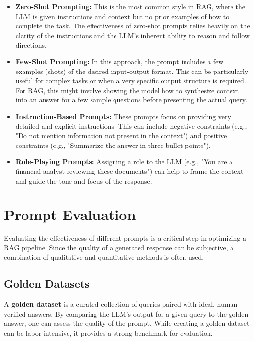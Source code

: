 \begin{itemize}
    \item \textbf{Zero-Shot Prompting:} This is the most common style in RAG, where the LLM is given instructions and context but no prior examples of how to complete the task. The effectiveness of zero-shot prompts relies heavily on the clarity of the instructions and the LLM's inherent ability to reason and follow directions.
    
    \item \textbf{Few-Shot Prompting:} In this approach, the prompt includes a few examples (shots) of the desired input-output format. This can be particularly useful for complex tasks or when a very specific output structure is required. For RAG, this might involve showing the model how to synthesize context into an answer for a few sample questions before presenting the actual query.
    
    \item \textbf{Instruction-Based Prompts:} These prompts focus on providing very detailed and explicit instructions. This can include negative constraints (e.g., "Do not mention information not present in the context") and positive constraints (e.g., "Summarize the answer in three bullet points").
    
    \item \textbf{Role-Playing Prompts:} Assigning a role to the LLM (e.g., "You are a financial analyst reviewing these documents") can help to frame the context and guide the tone and focus of the response.
\end{itemize}

\section{Prompt Evaluation}
Evaluating the effectiveness of different prompts is a critical step in optimizing a RAG pipeline. Since the quality of a generated response can be subjective, a combination of qualitative and quantitative methods is often used.

\subsection{Golden Datasets}
A \textbf{golden dataset} is a curated collection of queries paired with ideal, human-verified answers. By comparing the LLM's output for a given query to the golden answer, one can assess the quality of the prompt. While creating a golden dataset can be labor-intensive, it provides a strong benchmark for evaluation.

